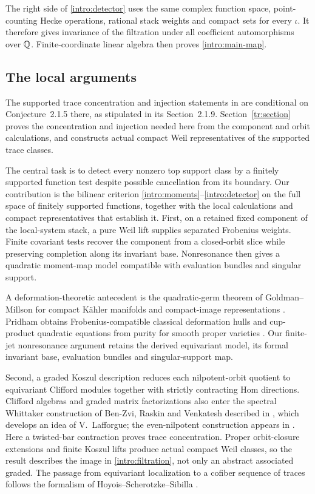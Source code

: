 The right side of \eqref{intro:detector} uses the same complex function
space, point-counting Hecke operations, rational stack weights and compact
sets for every $\iota$. It therefore gives invariance of the filtration
under all coefficient automorphisms over $\mathbb Q$. Finite-coordinate linear
algebra then proves \eqref{intro:main-map}.

\subsection{The local arguments}

The supported trace concentration and injection statements in
\cite[Corollaries~2.1.10 and~2.1.13]{GLR} are conditional on
Conjecture~2.1.5 there, as stipulated in its Section~2.1.9.
Section~\ref{tr:section} proves the concentration and injection needed
here from the component and orbit calculations, and constructs actual
compact Weil representatives of the supported trace classes.

The central task is to detect every nonzero top support class by a
finitely supported function test despite possible cancellation from its
boundary.
Our contribution is the bilinear criterion
\eqref{intro:moments}--\eqref{intro:detector} on the full space of
finitely supported functions, together with the local calculations and
compact representatives that establish it. First, on a retained fixed
component of the local-system stack, a pure Weil lift supplies separated
Frobenius weights. Finite covariant tests recover the component from a
closed-orbit slice while preserving completion along its invariant base.
Nonresonance then gives a quadratic moment-map model compatible with
evaluation bundles and singular support.

A deformation-theoretic antecedent is the quadratic-germ theorem of
Goldman--Millson for compact K\"ahler manifolds and compact-image
representations \cite[Theorem~1]{GoldmanMillson}. Pridham obtains
Frobenius-compatible classical deformation hulls and cup-product
quadratic equations from purity for smooth proper varieties
\cite[Theorem~2.11 and Corollary~2.12]{Pridham}. Our finite-jet
nonresonance argument retains the derived equivariant model, its formal
invariant base, evaluation bundles and singular-support map.

Second, a graded Koszul description reduces each nilpotent-orbit
quotient to equivariant Clifford modules together with strictly
contracting Hom directions. Clifford algebras and graded matrix
factorizations also enter the spectral Whittaker construction of
Ben-Zvi, Raskin and Venkatesh described in \cite[Section~4.5]{Raskin},
which develops an idea of V.~Lafforgue; the even-nilpotent construction
appears in \cite[Section~18.5]{BZSV}. Here a twisted-bar contraction
proves trace concentration. Proper orbit-closure extensions and finite Koszul lifts
produce actual compact Weil classes, so the result describes the image
in \eqref{intro:filtration}, not only an abstract associated graded.
The passage from equivariant localization to a cofiber sequence of
traces follows the formalism of Hoyois--Scherotzke--Sibilla
\cite[Theorem~3.4 and Proposition~5.4]{HSS}.

